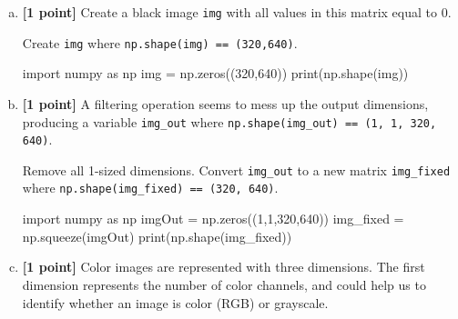 \documentclass[11pt]{article}
\begin{document}
\begin{enumerate}[(a)]
    \item \textbf{[1 point]} Create a black image \texttt{img} with all values in this matrix equal to 0. 
    
    \begin{tcolorbox}[colback=orange!5!white,colframe=orange!75!black]
    Create \texttt{img} where \texttt{np.shape(img) == (320,640)}.
    \end{tcolorbox}
    
    \begin{tcolorbox}[colback=white!5!white,colframe=green!75!black,height=2cm]
    \begin{python}
    import numpy as np
    img = np.zeros((320,640))
    print(np.shape(img))
    \end{python}
    \end{tcolorbox}
    
    \item \textbf{[1 point]} A filtering operation seems to mess up the output dimensions, producing a variable \texttt{img\_out} where \texttt{np.shape(img\_out) == (1, 1, 320, 640)}.
    
    \begin{tcolorbox}[colback=orange!5!white,colframe=orange!75!black]
    Remove all 1-sized dimensions. Convert \texttt{img\_out} to a new matrix \texttt{img\_fixed} where \texttt{np.shape(img\_fixed) == (320, 640)}.
    \end{tcolorbox}

\begin{tcolorbox}[colback=white!5!white,colframe=green!75!black,height=2cm]
    \begin{python}
    import numpy as np
    imgOut = np.zeros((1,1,320,640))
    img_fixed = np.squeeze(imgOut)
    print(np.shape(img_fixed))
    \end{python}
    \end{tcolorbox}
    
    \pagebreak
    \item \textbf{[1 point]} Color images are represented with three dimensions. The first dimension represents the number of color channels, and could help us to identify whether an image is color (RGB) or grayscale. 
    

\end{enumerate}
\end{document}
